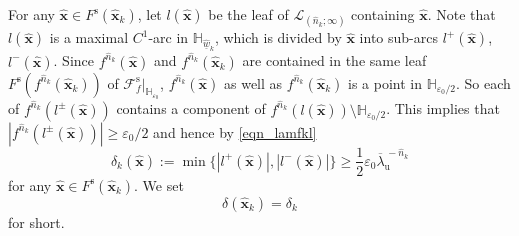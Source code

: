 \documentclass{amsart}
\theoremstyle{plain}
\theoremstyle{definition}
\numberwithin{equation}{section}
\numberwithin{figure}{section}
\def\hh{\mathbb{H}}
\def\bx{{\boldsymbol{x}}}
\def\wh{\widehat}
\def\ve{\varepsilon}
\def\ol{\overline}
\def\rs{{\mathrm{s}}}
\begin{document}
For any $\wh\bx\in F^{\rs}(\wh\bx_k)$, let $l(\widehat{\boldsymbol{x}})$ be the leaf of $\mathcal{L}_{(\widehat n_k;\infty)}$ containing $\widehat{\boldsymbol{x}}$.
Note that $l(\widehat{\boldsymbol{x}})$ is a maximal $C^1$-arc in $\mathbb{H}_{\widehat{\underline{w}}_k}$, which is divided by $\widehat{\boldsymbol{x}}$ into sub-arcs $l^+(\widehat{\boldsymbol{x}})$, $l^-(\widehat{\boldsymbol{x}})$.
Since $f^{\wh n_k}(\wh \bx)$ and $f^{\wh n_k}(\wh \bx_k)$ are contained 
in the same leaf $F^{\rs}(f^{\wh n_k}(\wh \bx_k))$ of $\mathcal{F}_f^{\rs}|_{\hh_{\ve_0}}$, $f^{\wh n_k}(\wh \bx)$ as well as $f^{\wh n_k}(\wh \bx_k)$ is a point 
in $\hh_{\ve_0/2}$.
So each of $f^{\wh n_k}(l^\pm(\wh \bx))$ contains a component of $f^{\wh n_k}(l(\widehat{\boldsymbol{x}}))
\setminus \hh_{\ve_0/2}$.
This implies that 
$|f^{\wh n_k}(l^\pm(\wh \bx))|\geq \ve_0/2$ 
and hence by \eqref{eqn_lamfkl} 
\begin{equation}\label{eqn_delta_kx}
\delta_{k}(\wh\bx):= \min\bigl\{|l^+(\widehat{\boldsymbol{x}})|, |l^-(\widehat{\boldsymbol{x}})|\bigr\}
\geq 
\frac12 \ve_0\ol\lambda_{\mathrm{u}}^{\,-\widehat n_{k}}
\end{equation}
for any $\wh\bx\in F^{\rs}(\wh\bx_k)$.
We set 
\begin{equation}\label{eqn_delta_k}
\delta(\wh\bx_k)=\delta_k
\end{equation}
for short.
\end{document}
